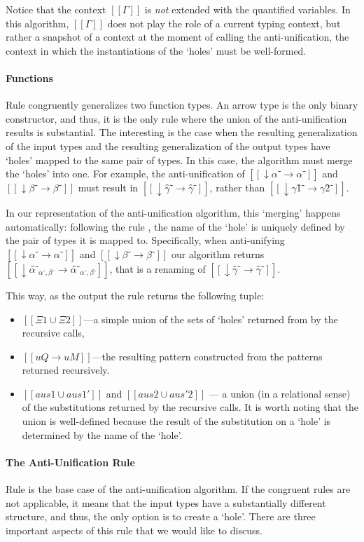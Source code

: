  Notice that the context $[[Γ]]$ is \emph{not} extended with 
  the quantified variables. In this algorithm, $[[Γ]]$ 
  does not play the role of a current typing context, but rather
  a snapshot of a context at the moment of calling the anti-unification,
  \ie the context in which the instantiations of the `holes' 
  must be well-formed.

\paragraph*{Functions}
  Rule  congruently generalizes two function types. 
  An arrow type is the only binary constructor, 
  and thus, it is the only rule where the union of the anti-unification results is substantial.
  The interesting is the case when the resulting generalization of the 
  input types and the resulting generalization of the output types 
  have `holes' mapped to the same pair of types. 
  In this case, the algorithm must merge the `holes' into one.
  For example, the anti-unification of 
  $[[↓α⁻ → α⁻]]$ and $[[↓β⁻ → β⁻]]$
  must result in $[[↓γ̂⁻ → γ̂⁻]]$,
  rather than $[[↓γ1̂⁻ → γ2̂⁻]]$.

  In our representation of the anti-unification algorithm, this `merging' happens
  automatically:
  following the rule ,
  the name of the `hole' is uniquely defined by the pair of types it is mapped to.  
  Specifically, when anti-unifying $[[↓α⁻ → α⁻]]$ and $[[↓β⁻ → β⁻]]$ our algorithm returns 
  $[[↓α̂⁻_{α⁻, β⁻} → α̂⁻_{α⁻, β⁻}]]$, that is a renaming of $[[↓γ̂⁻ → γ̂⁻]]$.

  This way, as the output the rule returns the following tuple:
  \begin{itemize}
    \item $[[Ξ1 ∪ Ξ2]]$---a simple union of the sets of `holes' 
      returned from by the recursive calls, 
    \item $[[uQ → uM]]$---the resulting pattern 
      constructed from the patterns returned recursively.
    \item $[[aus1 ∪ aus1']]$ and $[[aus2 ∪ aus'2]]$
      --- a union (in a relational sense)
      of the substitutions returned by the recursive calls. 
      It is worth noting that the union is well-defined because
      the result of the substitution on a `hole' is determined by the 
      name of the `hole'.
  \end{itemize}

\paragraph*{The Anti-Unification Rule}
  Rule  is the base case of the anti-unification
  algorithm. If the congruent rules are not applicable, 
  it means that the input types have a substantially different structure,
  and thus, the only option is to create a `hole'. 
  There are three important aspects of this rule that we would like to discuss.

